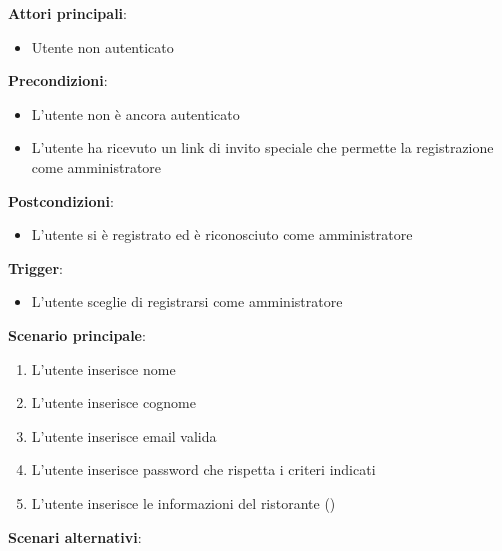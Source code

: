 \textbf{Attori principali}: 
\begin{itemize}
    \item Utente non autenticato
\end{itemize}
\textbf{Precondizioni}:
\begin{itemize}
    \item L'utente non è ancora autenticato
    \item L'utente ha ricevuto un link di invito speciale che permette la registrazione come amministratore
\end{itemize}
\textbf{Postcondizioni}: 
\begin{itemize}
    \item L'utente si è registrato ed è riconosciuto come amministratore
\end{itemize}
\textbf{Trigger}:
\begin{itemize}
    \item L'utente sceglie di registrarsi come amministratore
\end{itemize}
\textbf{Scenario principale}:
\begin{enumerate}
    \item L'utente inserisce nome
    \item L'utente inserisce cognome
    \item L'utente inserisce email valida
    \item L'utente inserisce password che rispetta i criteri indicati
    \item L'utente inserisce le informazioni del ristorante ()
\end{enumerate}
\textbf{Scenari alternativi}:
